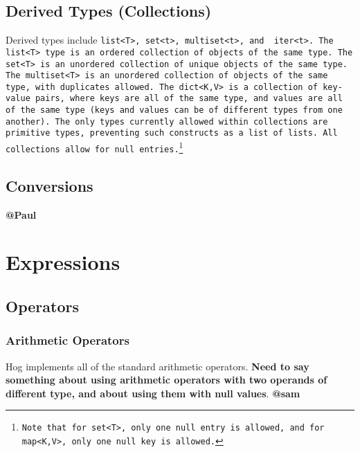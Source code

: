 \documentclass{book}
\begin{document}

\section{Derived Types (Collections)} %
\label{sec:derived_types_collections_}

Derived types include \tt list<T>\rm, \tt set<t>\rm, \tt multiset<t>\rm, and \tt
iter<t>\rm. The \tt list<T> \rm type is an ordered collection of objects of the
same type. The \tt set<T> \rm is an unordered collection of unique objects of the
same type. The \tt multiset<T> \rm is an unordered collection of objects of the
same type, with duplicates allowed. The \tt dict<K,V> \rm is a collection of
key­value pairs, where keys are all of the same type, and values are all of the
same type (keys and values can be of different types from one another). The only
types currently allowed within collections are primitive types, preventing such
constructs as a list of lists. All collections allow for null
entries.\footnote{Note that for \tt set<T>\rm, only one \tt null \rm entry is
allowed, and for \tt map<K,V>\rm, only one \tt null \rm key is allowed.}


\section{Conversions} %
\label{sec:conversions}

\textbf{@Paul}



\chapter{Expressions} %
\label{cha:expressions}

\section{Operators} %
\label{sec:operators}

\subsection{Arithmetic Operators} %
\label{sub:arithmetic_operators}

Hog implements all of the standard arithmetic operators. \textbf{Need to say
something about using arithmetic operators with two operands of different type, and
about using them with null values}. \textbf{@sam}
\end{document}
